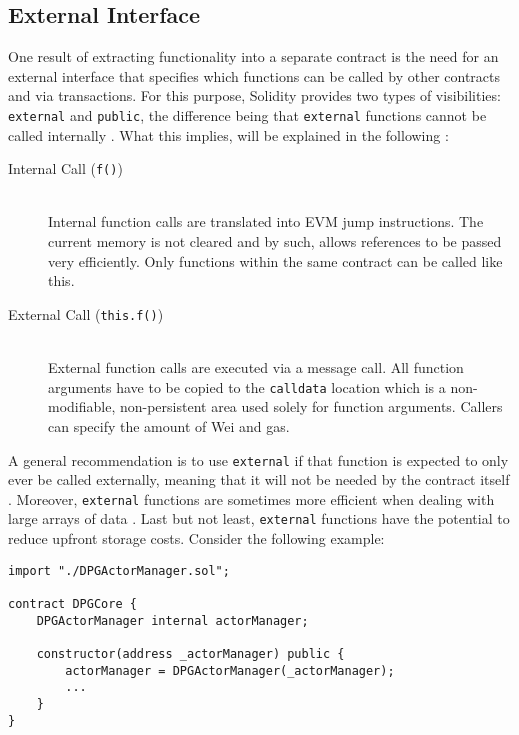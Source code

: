 \subsection{External Interface}
One result of extracting functionality into a separate contract is the need for an external interface that specifies which functions can be called by other contracts and via transactions. For this purpose, Solidity provides two types of visibilities: \texttt{external} and \texttt{public}, the difference being that \texttt{external} functions cannot be called internally \cite[p.~77]{solidityDocs}. What this implies, will be explained in the following \cite[pp.~57, 69]{solidityDocs}:

\begin{description}
	\item[Internal Call (\texttt{f()})]
	\hfill \\
	Internal function calls are translated into \ac{EVM} jump instructions. The current memory is not cleared and by such, allows references to be passed very efficiently. Only functions within the same contract can be called like this.
	\item[External Call (\texttt{this.f()})]
	\hfill \\
	External function calls are executed via a message call. All function arguments have to be copied to the \texttt{calldata} location which is a non-modifiable, non-persistent area used solely for function arguments. Callers can specify the amount of Wei and gas. 
\end{description}

A general recommendation is to use \texttt{external} if that function is expected to only ever be called externally, meaning that it will not be needed by the contract itself \cite{externalPublic}. Moreover, \texttt{external} functions are sometimes more efficient when dealing with large arrays of data \cite[p.~77]{solidityDocs}. Last but not least, \texttt{external} functions have the potential to reduce upfront storage costs. Consider the following example:

\begin{lstlisting}[language=Solidity, caption=Sharing external contract interface via inheritance, label=lst:actorManagerReference]
import "./DPGActorManager.sol";

contract DPGCore {
	DPGActorManager internal actorManager;
	
	constructor(address _actorManager) public {
		actorManager = DPGActorManager(_actorManager);
		...
	}
}
\end{lstlisting}

